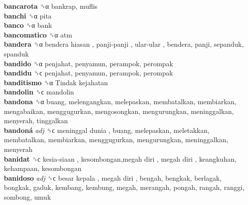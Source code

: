 \textbf{bancarota} ␝α  bankrap, muflis  \\
\textbf{banchi} ␝α  pita  \\
\textbf{banco} ␝α  bank  \\
\textbf{bancomatico} ␝α  atm  \\
\textbf{bandera} ␝α   bendera hiasan ,  panji-panji ,  ular-ular , bendera, panji, sepanduk, spanduk  \\
\textbf{bandido} ␝α  penjahat, penyamun, perampok, perompak  \\
\textbf{bandidu} ␝ϲ  penjahat, penyamun, perampok, perompak  \\
\textbf{banditismo} ␝α   Tindak kejahatan   \\
\textbf{bandolin} ␝ϲ  mandolin  \\
\textbf{bandona} ␝α  buang, melengangkan, melepaskan, membatalkan, membiarkan, mengabaikan, menggugurkan, mengosongkan, mengurungkan, meninggalkan, menyerah, tinggalkan  \\
\textbf{bandoná} \emph{adj}  ␝ϲ   meninggal dunia , buang, melepaskan, meletakkan, membatalkan, membiarkan, menggugurkan, mengurungkan, meninggalkan, menyerah  \\
\textbf{banidat} ␝ϲ   kesia-siaan ,  kesombongan,megah diri ,  megah diri , keangkuhan, kehampaan, kesombongan  \\
\textbf{banidoso} \emph{adj}  ␝ϲ   besar kepala ,  megah diri , bengah, bengkak, berlagak, bongkak, gaduk, kembang, kembung, megah, merangah, pongah, rangah, ranggi, sombong, umuk  \\
